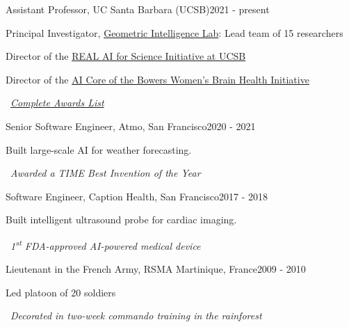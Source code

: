 
\begin{joblong}{Assistant Professor, UC Santa Barbara (UCSB)}{2021 - present}
\item Principal Investigator, \href{https://gi.ece.ucsb.edu/}{Geometric Intelligence Lab}: Lead team of 15 researchers
\item Director of the \href{https://www.ai.ece.ucsb.edu/}{REAL AI for Science Initiative at UCSB}
\item Director of the \href{https://wbhi.ucsb.edu/}{AI Core of the Bowers Women's Brain Health Initiative}
\item {\small{\faAward}}~\href{https://www.ninamiolane.com/pagecv}{\textit{Complete Awards List}}
\end{joblong}

\begin{joblong}{Senior Software Engineer, Atmo, San Francisco}{2020 - 2021}
\item Built large-scale AI for weather forecasting. 
\item {\small{\faAward}}~\textit{Awarded a TIME Best Invention of the Year}
\end{joblong}

\begin{joblong}{Software Engineer, Caption Health, San Francisco}{2017 - 2018}
\item Built  intelligent ultrasound probe for cardiac imaging. 
\item {\small{\faAward}}~\textit{1\textsuperscript{st} FDA-approved AI-powered medical device}
\end{joblong}

\begin{joblong}{Lieutenant in the French Army, RSMA Martinique, France}{2009 - 2010}
\item Led platoon of 20 soldiers
\item {\small{\faAward}}~\textit{Decorated in two-week commando training in the rainforest}
\end{joblong}

